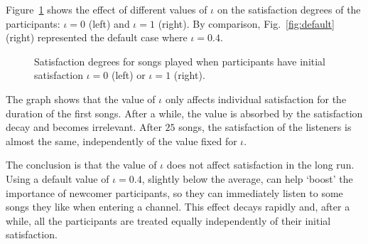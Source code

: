 Figure~\ref{fig:iota} shows the effect of different values of $\iota$ on the satisfaction degrees of the participants: $\iota = 0$ (left) and $\iota = 1$ (right).
By comparison, Fig.~\ref{fig:default} (right) represented the default case where $\iota = 0.4$.
%
\begin{figure}[bthp]
\centering \setlength{\abovecaptionskip}{3pt}
\caption{Satisfaction degrees for songs played when participants have initial satisfaction $\iota = 0$ (left) or $\iota = 1$ (right).}
\label{fig:iota}
\end{figure}


The graph shows that the value of $\iota$ only affects individual satisfaction for the duration of the first songs.
After a while, the value is absorbed by the satisfaction decay and becomes irrelevant.
After $25$ songs, the satisfaction of the listeners is almost the same, independently of the value fixed for $\iota$.

The conclusion is that the value of $\iota$ does not affect satisfaction in the long run.
Using a default value of $\iota = 0.4$, slightly below the average, can help `boost' the importance of newcomer participants, so they can immediately listen to some songs they like when entering a channel.
This effect decays rapidly and, after a while, all the participants are treated equally independently of their initial satisfaction.








% 
% 
% 
% 
% 
% 
% 
% 
% 
% 


